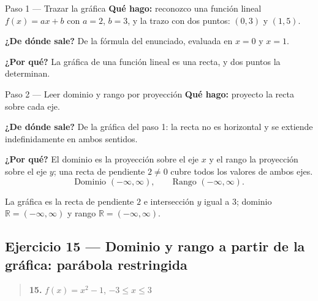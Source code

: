 \documentclass[11pt]{article}
\begin{document}
\begin{paso}{Paso 1 --- Trazar la gráfica}
\textbf{Qué hago:} reconozco una función lineal $f(x)=ax+b$ con $a=2$, $b=3$, y la trazo con dos puntos: $(0,3)$ y $(1,5)$.

\textbf{¿De dónde sale?} De la fórmula del enunciado, evaluada en $x=0$ y $x=1$.

\textbf{¿Por qué?} La gráfica de una función lineal es una recta, y dos puntos la determinan.
\begin{center}
\end{center}
\end{paso}

\begin{paso}{Paso 2 --- Leer dominio y rango por proyección}
\textbf{Qué hago:} proyecto la recta sobre cada eje.

\textbf{¿De dónde sale?} De la gráfica del paso 1: la recta no es horizontal y se extiende indefinidamente en ambos sentidos.

\textbf{¿Por qué?} El dominio es la proyección sobre el eje $x$ y el rango la proyección sobre el eje $y$; una recta de pendiente $2\ne 0$ cubre todos los valores de ambos ejes.
\[
\text{Dominio } (-\infty,\infty), \qquad \text{Rango } (-\infty,\infty).
\]
\end{paso}

\begin{resp}
La gráfica es la recta de pendiente $2$ e intersección $y$ igual a $3$; dominio $\mathbb{R}=(-\infty,\infty)$ y rango $\mathbb{R}=(-\infty,\infty)$.
\end{resp}

\subsection*{Ejercicio 15 — Dominio y rango a partir de la gráfica: parábola restringida}

\begin{quote}
\textbf{15.} $f(x)=x^2-1$, $-3\le x\le 3$
\end{quote}
\end{document}
